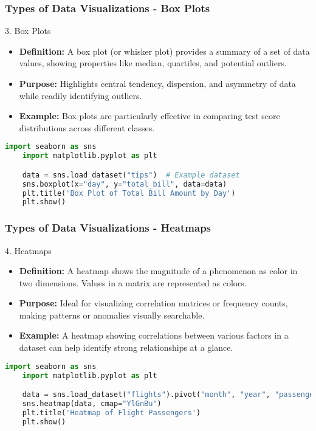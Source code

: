\documentclass[aspectratio=169]{beamer}
\begin{document}
\begin{frame}[fragile]
    \frametitle{Types of Data Visualizations - Box Plots}
    \begin{block}{3. Box Plots}
        \begin{itemize}
            \item \textbf{Definition:} A box plot (or whisker plot) provides a summary of a set of data values, showing properties like median, quartiles, and potential outliers.
            \item \textbf{Purpose:} Highlights central tendency, dispersion, and asymmetry of data while readily identifying outliers.
            \item \textbf{Example:} Box plots are particularly effective in comparing test score distributions across different classes.
        \end{itemize}
    \end{block}
    \begin{lstlisting}[language=Python]
    import seaborn as sns
    import matplotlib.pyplot as plt

    data = sns.load_dataset("tips")  # Example dataset
    sns.boxplot(x="day", y="total_bill", data=data)
    plt.title('Box Plot of Total Bill Amount by Day')
    plt.show()
    \end{lstlisting}
\end{frame}

\begin{frame}[fragile]
    \frametitle{Types of Data Visualizations - Heatmaps}
    \begin{block}{4. Heatmaps}
        \begin{itemize}
            \item \textbf{Definition:} A heatmap shows the magnitude of a phenomenon as color in two dimensions. Values in a matrix are represented as colors.
            \item \textbf{Purpose:} Ideal for visualizing correlation matrices or frequency counts, making patterns or anomalies visually searchable.
            \item \textbf{Example:} A heatmap showing correlations between various factors in a dataset can help identify strong relationships at a glance.
        \end{itemize}
    \end{block}
    \begin{lstlisting}[language=Python]
    import seaborn as sns
    import matplotlib.pyplot as plt

    data = sns.load_dataset("flights").pivot("month", "year", "passengers")
    sns.heatmap(data, cmap="YlGnBu")
    plt.title('Heatmap of Flight Passengers')
    plt.show()
    \end{lstlisting}
\end{frame}
\end{document}

